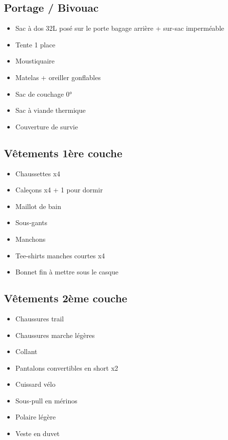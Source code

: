   \subsection*{ Portage / Bivouac}
 \begin{itemize}
 \item Sac à dos 32L posé sur le porte bagage arrière + sur-sac imperméable
 \item Tente 1 place
 \item Moustiquaire
 \item Matelas + oreiller gonflables
 \item Sac de couchage 0°
 \item Sac à viande thermique
 \item Couverture de survie
 \end{itemize}
 
 \pagebreak
  \subsection*{Vêtements 1ère couche}
 \begin{itemize}
 \item Chaussettes x4
 \item Caleçons x4 + 1 pour dormir
 \item Maillot de bain
 \item Sous-gants
 \item Manchons
 \item Tee-shirts manches courtes x4
 \item Bonnet fin à mettre sous le casque
 \end{itemize}
 
  \subsection*{Vêtements 2ème couche}
 \begin{itemize}
 \item Chaussures trail
 \item Chaussures marche légères
 \item Collant
 \item Pantalons convertibles en short x2
 \item Cuissard vélo
 \item Sous-pull en mérinos
 \item Polaire légère
 \item Veste en duvet
 \end{itemize}

